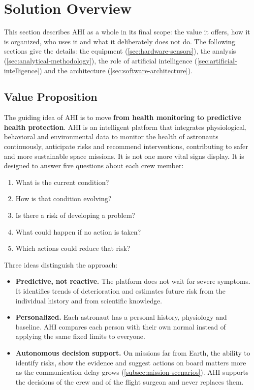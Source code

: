 \section{Solution Overview}
\label{sec:solution-overview}

This section describes AHI as a whole in its final scope: the value it offers, how it is organized, who uses it and what it deliberately does not do. The following sections give the details: the equipment (\ref{sec:hardware-sensors}), the analysis (\ref{sec:analytical-methodology}), the role of artificial intelligence (\ref{sec:artificial-intelligence}) and the architecture (\ref{sec:software-architecture}).

\subsection{Value Proposition}
\label{subsec:value-proposition}

The guiding idea of AHI is to move \textbf{from health monitoring to predictive health protection}. AHI is an intelligent platform that integrates physiological, behavioral and environmental data to monitor the health of astronauts continuously, anticipate risks and recommend interventions, contributing to safer and more sustainable space missions. It is not one more vital signs display. It is designed to answer five questions about each crew member:

\begin{enumerate}
\item What is the current condition?
\item How is that condition evolving?
\item Is there a risk of developing a problem?
\item What could happen if no action is taken?
\item Which actions could reduce that risk?
\end{enumerate}

Three ideas distinguish the approach:

\begin{itemize}
\item \textbf{Predictive, not reactive.} The platform does not wait for severe symptoms. It identifies trends of deterioration and estimates future risk from the individual history and from scientific knowledge.
\item \textbf{Personalized.} Each astronaut has a personal history, physiology and baseline. AHI compares each person with their own normal instead of applying the same fixed limits to everyone.
\item \textbf{Autonomous decision support.} On missions far from Earth, the ability to identify risks, show the evidence and suggest actions on board matters more as the communication delay grows (\ref{subsec:mission-scenarios}). AHI supports the decisions of the crew and of the flight surgeon and never replaces them.
\end{itemize}

